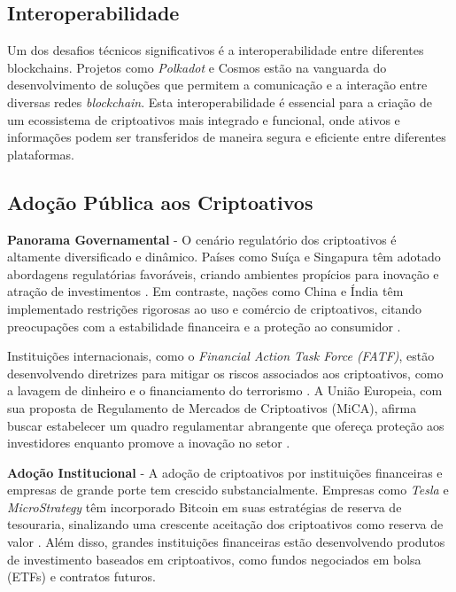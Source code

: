 \documentclass[article,12pt,oneside,a4paper,english,brazil]{unifil}
\begin{document}
\begin{Spacing}{1.5}
\subsection*{Interoperabilidade}

Um dos desafios técnicos significativos é a interoperabilidade entre diferentes blockchains. Projetos como \textit{Polkadot} \cite{wood2016polkadot} e Cosmos \cite{kwon2016cosmos} estão na vanguarda do desenvolvimento de soluções que permitem a comunicação e a interação entre diversas redes \textit{blockchain}. Esta interoperabilidade é essencial para a criação de um ecossistema de criptoativos mais integrado e funcional, onde ativos e informações podem ser transferidos de maneira segura e eficiente entre diferentes plataformas.

\subsection*{Adoção Pública aos Criptoativos}

\textbf{Panorama Governamental} - O cenário regulatório dos criptoativos é altamente diversificado e dinâmico. Países como Suíça e Singapura têm adotado abordagens regulatórias favoráveis, criando ambientes propícios para inovação e atração de investimentos \cite{zohar2015bitcoin}. Em contraste, nações como China e Índia têm implementado restrições rigorosas ao uso e comércio de criptoativos, citando preocupações com a estabilidade financeira e a proteção ao consumidor \cite{auer2018regulating}.

Instituições internacionais, como o \textit{Financial Action Task Force (FATF)}, estão desenvolvendo diretrizes para mitigar os riscos associados aos criptoativos, como a lavagem de dinheiro e o financiamento do terrorismo \cite{fatf2019guidance}. A União Europeia, com sua proposta de Regulamento de Mercados de Criptoativos (MiCA), afirma buscar estabelecer um quadro regulamentar abrangente que ofereça proteção aos investidores enquanto promove a inovação no setor \cite{european2020proposal}.

\textbf{Adoção Institucional} - A adoção de criptoativos por instituições financeiras e empresas de grande porte tem crescido substancialmente. Empresas como \textit{Tesla} e \textit{MicroStrategy} têm incorporado Bitcoin em suas estratégias de reserva de tesouraria, sinalizando uma crescente aceitação dos criptoativos como reserva de valor \cite{bouri2017hedge}. Além disso, grandes instituições financeiras estão desenvolvendo produtos de investimento baseados em criptoativos, como fundos negociados em bolsa (ETFs) e contratos futuros.


\end{Spacing}
\end{document}
